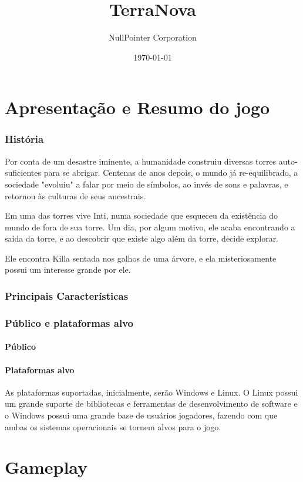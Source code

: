 \documentclass[11pt]{article}
\begin{document}
\title{TerraNova}
\author{NullPointer Corporation}
\date{\today}
\maketitle

\newpage

\tableofcontents
\newpage
\part{Apresentação e Resumo do jogo}

\section{História}
Por conta de um desastre iminente, a humanidade construiu diversas torres auto-suficientes para se abrigar.
Centenas de anos depois, o mundo já re-equilibrado, a sociedade "evoluiu" a falar por meio de símbolos, ao invés de sons e palavras, e retornou às culturas de seus ancestrais.

Em uma das torres vive Inti, numa sociedade que esqueceu da existência do mundo de fora de sua torre.
Um dia, por algum motivo, ele acaba encontrando a saída da torre, e ao descobrir que existe algo além da torre, decide explorar.

Ele encontra Killa sentada nos galhos de uma árvore, e ela misteriosamente possui um interesse grande por ele.

\section{Principais Características}
\section{Público e plataformas alvo}
\subsection{Público}
\subsection{Plataformas alvo}
As plataformas suportadas, inicialmente, serão Windows e Linux.
O Linux possui um grande suporte de bibliotecas e ferramentas de desenvolvimento de software e o Windows possui uma grande base de usuários jogadores, fazendo com que ambas os sistemas operacionais se tornem alvos para o jogo.
\newpage
\part{Gameplay}
\end{document}
